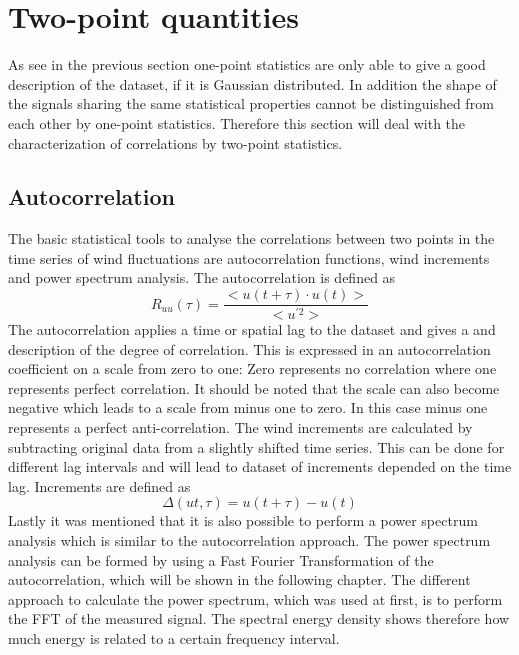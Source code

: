\documentclass[12pt]{article}
\begin{document}
\section{Two-point quantities}

As see in the previous section one-point statistics are only able to give a good description of the dataset, if it is Gaussian distributed. In addition the shape of the signals sharing the same statistical properties cannot be distinguished from each other by one-point statistics. Therefore this section will deal with the characterization of correlations by two-point statistics. \cite{peinke2}
\subsection{Autocorrelation}
The basic statistical tools to analyse the correlations between two points in the time series of wind fluctuations are autocorrelation functions, wind increments and power spectrum analysis.
The autocorrelation is defined as
\begin{equation}
R_{uu}(\tau) = \frac{<u(t+\tau)\cdot u(t)>}{<u^{'2}>}
\end{equation}
The autocorrelation applies a time or spatial lag to the dataset and gives a and description of the degree of correlation. This is expressed in an autocorrelation coefficient on a scale from zero to one: Zero represents no correlation where one represents perfect correlation. It should be noted that the scale can also become negative which leads to a scale from minus one to zero. In this case minus one represents a perfect anti-correlation.
The wind increments are calculated by subtracting original data from a slightly shifted time series. This can be done for different lag intervals and will lead to dataset of increments depended on the time lag. Increments are defined as
\begin{equation}
\Delta(ut,\tau) = u (t+\tau) - u (t)
\end{equation}
Lastly it was mentioned that it is also possible to perform a power spectrum analysis which is similar to the autocorrelation approach. The power spectrum analysis can be formed by using a Fast Fourier Transformation of the autocorrelation, which will be shown in the following chapter. The different approach to calculate the power spectrum, which was used at first, is to perform the FFT of the measured signal. The spectral energy density shows therefore how much energy is related to a certain frequency interval.
\end{document}
